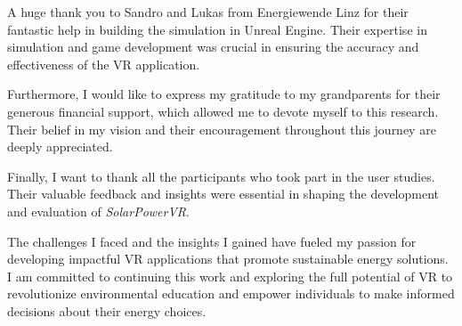 \documentclass[draft, final]{vutinfth} %
\begin{document}
\begin{acknowledgements*}
A huge thank you to Sandro and Lukas from Energiewende Linz for their fantastic help in building the simulation in Unreal Engine. Their expertise in simulation and game development was crucial in ensuring the accuracy and effectiveness of the VR application.

Furthermore, I would like to express my gratitude to my grandparents for their generous financial support, which allowed me to devote myself to this research. Their belief in my vision and their encouragement throughout this journey are deeply appreciated.

Finally, I want to thank all the participants who took part in the user studies. Their valuable feedback and insights were essential in shaping the development and evaluation of \textit{SolarPowerVR}.

The challenges I faced and the insights I gained have fueled my passion for developing impactful VR applications that promote sustainable energy solutions. I am committed to continuing this work and exploring the full potential of VR to revolutionize environmental education and empower individuals to make informed decisions about their energy choices. 
\end{acknowledgements*}
\end{document}
